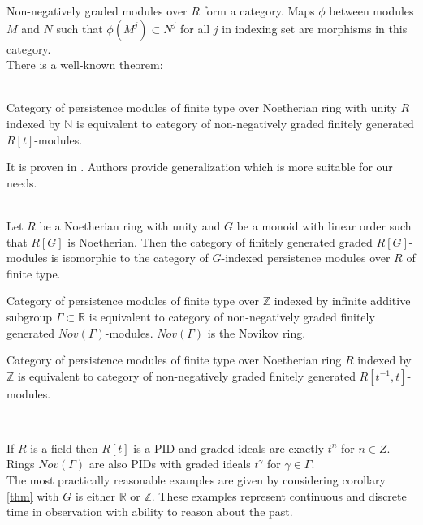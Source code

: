Non-negatively graded modules over $R$ form a category. Maps $\phi$ between modules $M$ and $N$ such that $\phi(M^j) \subset N^j$ for all $j$ in indexing set are morphisms in this category.\\

There is a well-known theorem:

\begin{theorem} {\cite[Theorem 3.1]{Zomorodian05}}\\
  Category of persistence modules of finite type over Noetherian ring with unity $R$ indexed by $\mathbb{N}$ is equivalent to category of non-negatively graded finitely generated $R[t]$-modules.
\end{theorem}

It is proven in {\cite{Corbet18}}. Authors provide generalization {\cite[Theorem 2]{Corbet18}} which is more suitable for our needs.\\

\begin{theorem} {\cite[Case of Corollary 20 of Theorem 2]{Corbet18}}\\
  Let $R$ be a Noetherian ring with unity and $G$ be a monoid with linear order such that $R[G]$ is Noetherian. Then the category of finitely generated graded $R[G]$-modules is isomorphic to the category of $G$-indexed persistence modules over $R$ of finite type.
\end{theorem}

\begin{corollary}
  \label{thm}
  Category of persistence modules of finite type over $\mathbb{Z}$ indexed by infinite additive subgroup $\Gamma \subset \mathbb{R}$ is equivalent to category of non-negatively graded finitely generated $Nov(\Gamma)$-modules. $Nov(\Gamma)$ is the Novikov ring.
\end{corollary}

\begin{corollary}
  Category of persistence modules of finite type over Noetherian ring $R$ indexed by $\mathbb{Z}$ is equivalent to category of non-negatively graded finitely generated $R[t^{-1},t]$-modules.
\end{corollary}

\begin{remark} ~ \par
  If $R$ is a field then $R[t]$ is a PID and graded ideals are exactly $t^n$ for $n \in Z$.\\
  Rings $Nov(\Gamma)$ are also PIDs with graded ideals $t^{\gamma}$ for $\gamma \in \Gamma$.\\

  The most practically reasonable examples are given by considering corollary \ref{thm} with $G$ is either $\mathbb{R}$ or $\mathbb{Z}$. These examples represent continuous and discrete time in observation with ability to reason about the past.
\end{remark}

